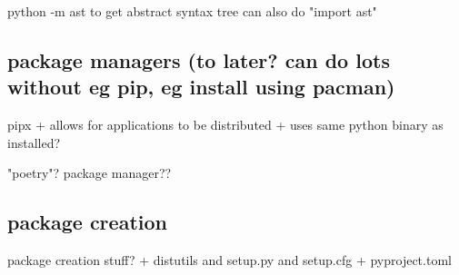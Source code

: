 python -m ast to get abstract syntax tree
can also do "import ast"
\subsection{package managers (to later? can do lots without eg pip, eg install using pacman)}
pipx
+ allows for applications to be distributed
+ uses same python binary as installed?

"poetry"? package manager??
\subsection{package creation}

package creation stuff?
+ distutils and setup.py and setup.cfg
+ pyproject.toml


